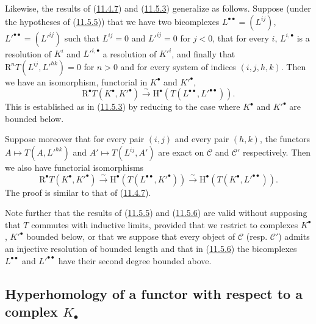 \begin{env}[11.5.6]
\label{0.11.5.6}
Likewise, the results of (\hyperref[0.11.4.7]{11.4.7}) and
(\hyperref[0.11.5.3]{11.5.3}) generalize as follows. Suppose (under
the hypotheses of (\hyperref[0.11.5.5]{11.5.5})) that we have two
bicomplexes $L^{\bullet\bullet}=(L^{ij})$,
$L'^{\bullet\bullet}=(L'^{ij})$ such that $L^{ij}=0$ and $L'^{ij}=0$ for
$j<0$, that for every $i$, $L^{i,\bullet}$ is a resolution of $K^i$ and
$L'^{i,\bullet}$ a resolution of $K'^i$, and finally that
$\mathrm R^nT(L^{ij},L'^{hk})=0$ for $n>0$ and for every system of indices
$(i,j,h,k)$. Then we have an isomorphism, functorial in $K^\bullet$ and
$K'^\bullet$,
\[
  \label{0.11.5.6.1}
  \mathrm R^\bullet T(K^\bullet,K'^\bullet)\xrightarrow{\sim}
  \mathrm H^\bullet(T(L^{\bullet\bullet},L'^{\bullet\bullet})).
  \tag{11.5.6.1}
\]
This is established as in (\hyperref[0.11.5.3]{11.5.3}) by reducing to the
case where $K^\bullet$ and $K'^\bullet$ are bounded below.

Suppose moreover that for every pair $(i,j)$ and every pair $(h,k)$,
the functors $A\mapsto T(A,L'^{hk})$ and $A'\mapsto T(L^{ij},A')$ are
exact on $\mathcal C$ and $\mathcal C'$ respectively. Then we also have
functorial isomorphisms
\[
  \label{0.11.5.6.2}
  \mathrm R^\bullet T(K^\bullet,K'^\bullet)
  \xrightarrow{\sim}\mathrm H^\bullet(T(L^{\bullet\bullet},K'^\bullet))
  \xrightarrow{\sim}\mathrm H^\bullet(T(K^\bullet,L'^{\bullet\bullet})).
  \tag{11.5.6.2}
\]
The proof is similar to that of
(\hyperref[0.11.4.7]{11.4.7}).
\end{env}

\begin{env}[11.5.7]
\label{0.11.5.7}
Note further that the results of (\hyperref[0.11.5.5]{11.5.5}) and
(\hyperref[0.11.5.6]{11.5.6}) are valid without supposing that $T$ commutes
with inductive limits, provided that we restrict to complexes
$K^\bullet$, $K'^\bullet$ bounded below, or that we suppose that every
object of $\mathcal C$ (resp. $\mathcal C'$) admits an injective resolution of
bounded length and that in (\hyperref[0.11.5.6]{11.5.6}) the bicomplexes
$L^{\bullet\bullet}$ and $L'^{\bullet\bullet}$ have their second degree bounded
above.
\end{env}

\subsection{Hyperhomology of a functor with respect to a complex
$K_\bullet$}
\label{subsection:0.11.6}


